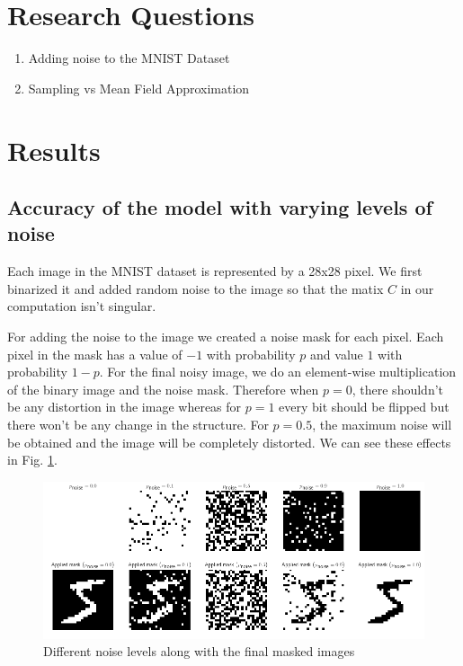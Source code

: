 \documentclass{article}
\begin{document}
\section{Research Questions}
\begin{enumerate}
  \item Adding noise to the MNIST Dataset
  \item Sampling vs Mean Field Approximation
\end{enumerate}

\section{Results}

\subsection{Accuracy of the model with varying levels of noise}
Each image in the MNIST dataset is represented by a 28x28 pixel. We first 
binarized it and added random noise to the image so that the matix $ C $ in our
computation isn't singular.

For adding the noise to the image we created a noise mask for each pixel. Each
pixel in the mask has a value of $ -1 $ with probability $ p $ and value $ 1 $
with probability $ 1-p $. For the final noisy image,  we do an 
element-wise multiplication of the binary image and the noise mask. 
Therefore when $ p=0 $, there shouldn't be any
distortion in the image whereas for $ p=1 $ every bit should be flipped but 
there won't be any change in the structure. For $ p=0.5 $, the maximum noise
will be obtained and the image will be completely distorted. We can see these
effects in Fig. \ref{fig:noise_level}.

\begin{figure}[ht]
  \centering
  \includegraphics[width=\textwidth]{noise}
  \caption{Different noise levels along with the final masked images}
  \label{fig:noise_level}
\end{figure}
\end{document}
